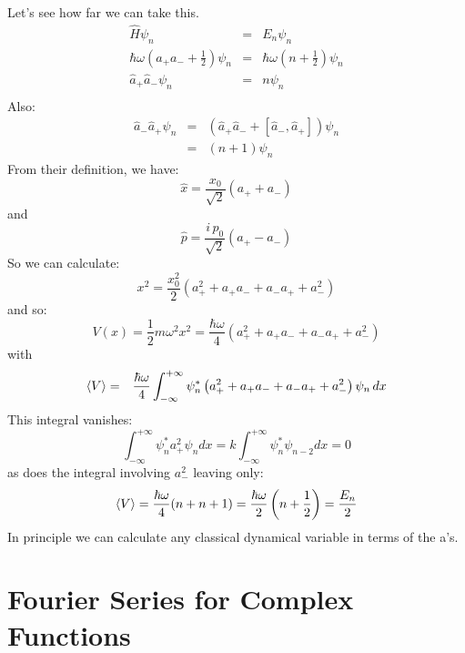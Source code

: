 \documentclass[12pt]{book}
\begin{document}
Let's see how far we can take this.
\begin{eqnarray*}
\hat{H} \psi_n &=& E_n \psi_n \\
\hbar\omega \left( a_+ a_- + \frac{1}{2} \right) \psi_n &=& \hbar \omega \left(n + \frac{1}{2} \right) \psi_n \\
\hat{a}_+ \hat{a}_- \psi_n &=& n \psi_n \\
\end{eqnarray*}
Also:
\begin{eqnarray*}
\hat{a}_- \hat{a}_+ \psi_n &=& \left(\hat{a}_+\hat{a}_- + [\hat{a}_-,\hat{a}_+]\right) \psi_n \\
&=& (n+1) \psi_n
\end{eqnarray*}
From their definition, we have:
\begin{equation*}
\hat{x} = \frac{x_0}{\sqrt{2}} \left( a_+ + a_-\right)
\end{equation*}
and 
\begin{equation*}
\hat{p} = \frac{i\,p_0}{\sqrt{2}} \left( a_+ - a_-\right)
\end{equation*}
So we can calculate:
\begin{equation*}
x^2 = \frac{x_0^2}{2} \left( a_+^2 + a_+a_- + a_-a_+ + a_-^2 \right)
\end{equation*}
and so:
\begin{equation*}
V(x) = \frac{1}{2}m \omega^2 x^2= \frac{\hbar \omega}{4} \left( a_+^2 + a_+a_- + a_-a_+ + a_-^2 \right)
\end{equation*}
with
\begin{eqnarray*}
\braket{V} &=& \frac{\hbar \omega}{4} \int_{-\infty}^{+\infty} \psi_n^* \left( a_+^2 + a_+a_- + a_-a_+ + a_-^2 \right) \psi_n \, dx
\end{eqnarray*}
This integral vanishes:
$$\int_{-\infty}^{+\infty} \psi_n^* a_+^2 \psi_n dx = k \int_{-\infty}^{+\infty} \psi_n^* \psi_{n-2} dx
 = 0 $$
as does the integral involving $a_-^2$ leaving only:
\begin{equation*}
\braket{V} = \frac{\hbar \omega}{4} (n + n + 1) = \frac{\hbar \omega}{2} \left(n + \frac{1}{2}\right) 
= \frac{E_n}{2}
\end{equation*}
In principle we can calculate any classical dynamical variable in terms of the a's.


\section{Fourier Series for Complex Functions}
\end{document}
